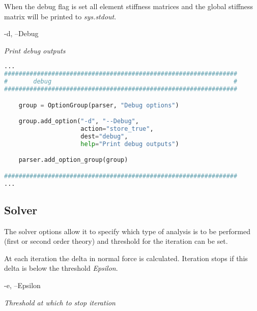When the debug flag is set all element stiffness matrices and the global stiffness matrix will be printed to \textit{sys.stdout}.

\vspace{2em}
\begin{addmargin}[2em]{1em}
-d, --Debug

\textit{Print debug outputs}
\end{addmargin}
\vspace{2em}

\begin{inconsolata}
\begin{minipage}{\linewidth}
\begin{lstlisting}[language=python]
...
################################################################
#       debug                                                  #
################################################################

    group = OptionGroup(parser, "Debug options")

    group.add_option("-d", "--Debug",
                     action="store_true",
                     dest="debug",
                     help="Print debug outputs")

    parser.add_option_group(group)

################################################################
...
\end{lstlisting}
\end{minipage}
\end{inconsolata}

\subsection{Solver}
\label{subsec:solver}

The solver options allow it to specify which type of analysis is to be performed (first or second order theory) and threshold for the iteration can be set. 

At each iteration the delta in normal force is calculated. Iteration stops if this delta is below the threshold \textit{Epsilon}.

\vspace{2em}
\begin{addmargin}[2em]{1em}
-e, --Epsilon

\textit{Threshold at which to stop iteration}
\end{addmargin}
\vspace{2em}

